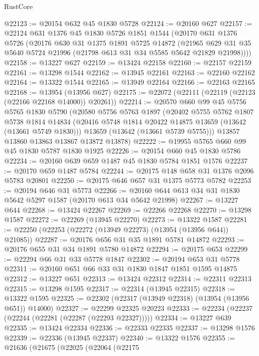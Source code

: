 \begin{lexlean}{RustCore}
\begin{coremodule}
@22123 := @20154 @632 @45 @1830 @5728
@22124 := @20160 @627
@22157 := @22124
    @631
    @1376
    @45
    @1830
    @5726
    @1851
    @1544
    (@20170
      @631
      @1376
      @5726
      (@20176
        @630
        @31
        @1375
        @1891
        @5725
        @14872
        (@21965 @629 @31 @35 @5640 @5724 @21996 (@21798 @613 @31 @34 @5585 @5642 @21829 @21998))))
@22158 := @13227 @627
@22159 := @13424 @22158
@22160 := @22157 @22159
@22161 := @13298 @1544
@22162 := @13945 @22161
@22163 := @22160 @22162
@22164 := @13322 @1544
@22165 := @13949 @22164
@22166 := @22163 @22165
@22168 := @13954 (@13956 @627)
@22175 := @22072 (@22111 (@22119 (@22123 (@22166 @22168 @14000)) @20261))
@22214 := @20570
    @660
    @99
    @45
    @5756
    @5765
    @1830
    @5790
    (@20580
      @5756
      @5763
      @1897
      (@20402
        @5755
        @5762
        @1807
        @5738
        @1814
        @14834
        (@20416 @5748 @1814 @20422 @14875 @13659 (@13642 (@13661 @5749 @1830)))
        @13659
        (@13642 (@13661 @5739 @5755)))
      @13857
      @13860
      @13863
      @13867
      @13872
      @13878)
@22222 := @19955 @5765 @660 @99 @45 @1830 @5787 @1830 @1925
@22226 := @20154 @660 @45 @1830 @5786
@22234 := @20160 @639 @659 @1487 @45 @1830 @5784 @1851 @1576
@22237 := @20170 @659 @1487 @5784
@22244 := @20175 @148 @658 @31 @1376 @2096 @5783 @20801
@22250 := @20175 @646 @657 @31 @1375 @5773 @5782
@22253 := @20194 @646 @31 @5773
@22266 := @20160 @644 @613 @34 @31 @1830 @5642 @5297 @1587 (@20170 @613 @34 @5642 @21998)
@22267 := @13227 @644
@22268 := @13424 @22267
@22269 := @22266 @22268
@22270 := @13298 @1587
@22272 := @22269 (@13945 @22270)
@22273 := @13322 @1587
@22281 := @22250 (@22253 (@22272 (@13949 @22273) (@13954 (@13956 @644)) @21085))
@22287 := @20176 @656 @31 @35 @1891 @5781 @14872
@22293 := @20176 @655 @31 @34 @1891 @5780 @14872
@22294 := @20175 @653
@22299 := @22294 @66 @31 @33 @5778 @1847
@22302 := @20194 @653 @31 @5778
@22311 := @20160 @651 @66 @33 @31 @1830 @1847 @1851 @1595 @14875
@22312 := @13227 @651
@22313 := @13424 @22312
@22314 := @22311 @22313
@22315 := @13298 @1595
@22317 := @22314 (@13945 @22315)
@22318 := @13322 @1595
@22325 := @22302 (@22317 (@13949 @22318) (@13954 (@13956 @651)) @14000)
@22327 := @22299 @22325 @20223
@22333 := @22234 (@22237 (@22244 (@22281 (@22287 (@22293 @22327)))))
@22334 := @13227 @639
@22335 := @13424 @22334
@22336 := @22333 @22335
@22337 := @13298 @1576
@22339 := @22336 (@13945 @22337)
@22340 := @13322 @1576
@22355 := @21636
    (@21675
      (@22025
        (@22064
          (@22175

\end{coremodule}
\end{lexlean}
